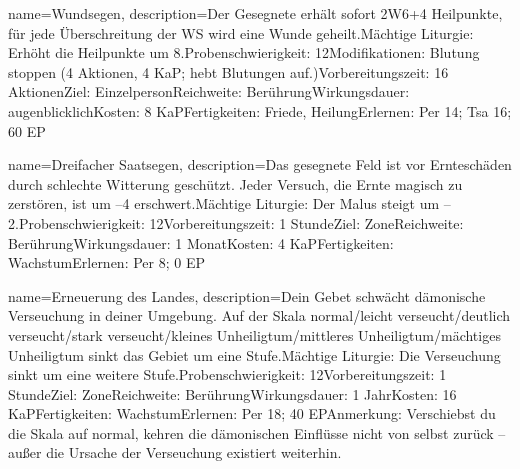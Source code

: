 {
    name={Wundsegen},
    description={Der Gesegnete erhält sofort 2W6+4 Heilpunkte, für jede Überschreitung der WS wird eine Wunde geheilt.\newline Mächtige Liturgie: Erhöht die Heilpunkte um 8.\newline Probenschwierigkeit: 12\newline Modifikationen: Blutung stoppen (4 Aktionen, 4 KaP; hebt Blutungen auf.)\newline Vorbereitungszeit: 16 Aktionen\newline Ziel: Einzelperson\newline Reichweite: Berührung\newline Wirkungsdauer: augenblicklich\newline Kosten: 8 KaP\newline Fertigkeiten: Friede, Heilung\newline Erlernen: Per 14; Tsa 16; 60 EP}
}


{
    name={Dreifacher Saatsegen},
    description={Das gesegnete Feld ist vor Ernteschäden durch schlechte Witterung geschützt. Jeder Versuch, die Ernte magisch zu zerstören, ist um –4 erschwert.\newline Mächtige Liturgie: Der Malus steigt um –2.\newline Probenschwierigkeit: 12\newline Vorbereitungszeit: 1 Stunde\newline Ziel: Zone\newline Reichweite: Berührung\newline Wirkungsdauer: 1 Monat\newline Kosten: 4 KaP\newline Fertigkeiten: Wachstum\newline Erlernen: Per 8; 0 EP}
}


{
    name={Erneuerung des Landes},
    description={Dein Gebet schwächt dämonische Verseuchung in deiner Umgebung. Auf der Skala normal/leicht verseucht/deutlich verseucht/stark verseucht/kleines Unheiligtum/mittleres Unheiligtum/mächtiges Unheiligtum sinkt das Gebiet um eine Stufe.\newline Mächtige Liturgie: Die Verseuchung sinkt um eine weitere Stufe.\newline Probenschwierigkeit: 12\newline Vorbereitungszeit: 1 Stunde\newline Ziel: Zone\newline Reichweite: Berührung\newline Wirkungsdauer: 1 Jahr\newline Kosten: 16 KaP\newline Fertigkeiten: Wachstum\newline Erlernen: Per 18; 40 EP\newline Anmerkung: Verschiebst du die Skala auf normal, kehren die dämonischen Einflüsse nicht von selbst zurück – außer die Ursache der Verseuchung existiert weiterhin.}
}


